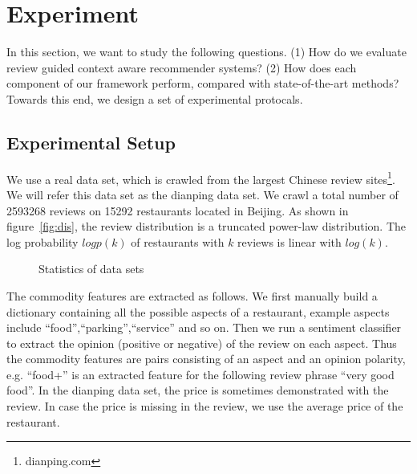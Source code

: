 \documentclass[sigconf]{acmart}
\begin{document}
\section{Experiment}\label{sec:exp}
In this section, we want to study the following questions. (1) How do we evaluate review guided context aware recommender systems? (2) How does each component of our framework perform, compared with state-of-the-art methods? Towards this end, we design a set of experimental protocals. 

\subsection{Experimental Setup}
We use a  real data set, which is crawled from the largest Chinese review sites\footnote{dianping.com}. We will refer this data set as the dianping data set. We crawl a total number of 2593268 reviews on 15292 restaurants located in Beijing. As shown in figure~\ref{fig:dis}, the review distribution is a truncated power-law distribution. The log probability $logp(k)$ of restaurants with $k$ reviews is linear with $log(k)$. 

\begin{figure}
\caption{Statistics of data sets}
\end{figure}

The commodity features are extracted as follows. We first manually build a dictionary containing all the possible aspects of a restaurant, example aspects include ``food'',``parking'',``service'' and so on. Then we run a sentiment classifier~\cite{Liu2005Opinion} to extract the opinion (positive or negative) of the review on each aspect.  Thus the commodity features are pairs consisting of an aspect and an opinion polarity, e.g. ``food+'' is an extracted feature for the following review phrase ``very good food''. In the dianping data set, the price is sometimes demonstrated with the review. In case the price is missing in the review, we use the average price of the restaurant.
\end{document}
